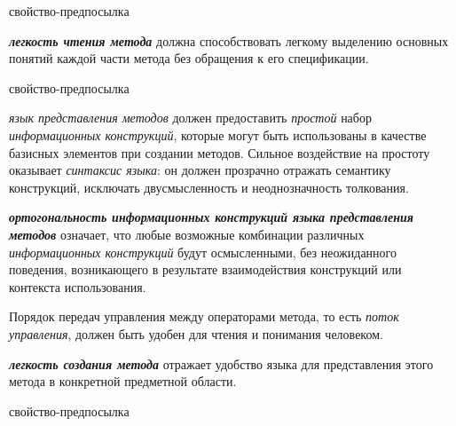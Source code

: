 \begin{SCn}
\begin{scnrelfromlist}{свойство-предпосылка}
\end{scnrelfromlist}
\end{SCn}

\textbf{\textit{легкость чтения метода}} должна способствовать легкому выделению основных понятий каждой части метода без обращения к его спецификации.

\begin{SCn}
\begin{scnrelfromlist}{свойство-предпосылка}
\end{scnrelfromlist}
\end{SCn}

\textit{язык представления методов} должен предоставить \textit{простой} набор \textit{информационных конструкций}, которые могут быть использованы в качестве базисных элементов при создании методов.
Сильное воздействие на простоту оказывает \textit{синтаксис языка}: он должен прозрачно отражать семантику конструкций, исключать двусмысленность и неоднозначность толкования.

\textbf{\textit{ортогональность информационных конструкций языка представления методов}} означает, что любые возможные комбинации различных \textit{информационных конструкций} будут осмысленными, без неожиданного поведения, возникающего в результате взаимодействия конструкций или контекста использования.

Порядок передач управления между операторами метода, то есть \textit{поток управления}, должен быть удобен для чтения и понимания человеком.

\textbf{\textit{легкость создания метода}} отражает удобство языка для представления этого метода в конкретной предметной области.

\begin{SCn}
\begin{scnrelfromlist}{свойство-предпосылка}
\end{scnrelfromlist}
\end{SCn}


